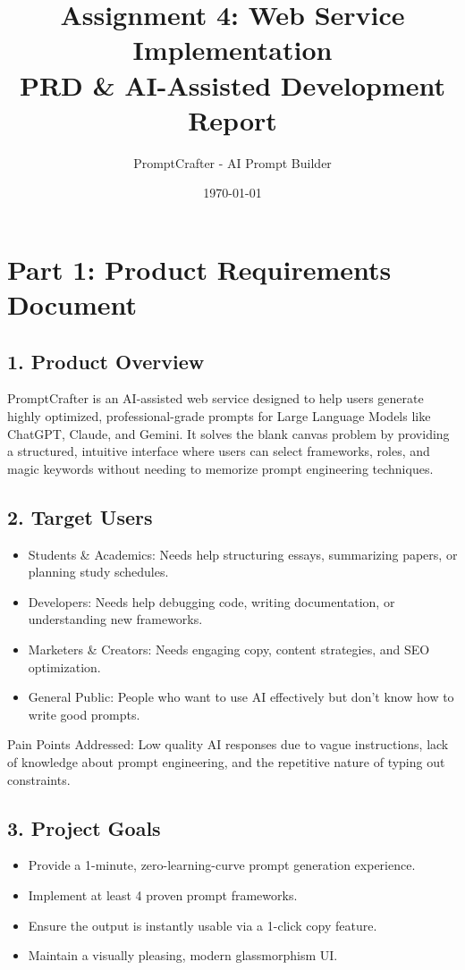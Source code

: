 \documentclass[11pt]{article}
\title{\textbf{Assignment 4: Web Service Implementation} \\ \large PRD \& AI-Assisted Development Report}
\author{PromptCrafter - AI Prompt Builder}
\date{\today}
\begin{document}
\maketitle

\section*{Part 1: Product Requirements Document}

\subsection*{1. Product Overview}
PromptCrafter is an AI-assisted web service designed to help users generate highly optimized, professional-grade prompts for Large Language Models like ChatGPT, Claude, and Gemini. It solves the blank canvas problem by providing a structured, intuitive interface where users can select frameworks, roles, and magic keywords without needing to memorize prompt engineering techniques.

\subsection*{2. Target Users}
\begin{itemize}[noitemsep]
    \item Students \& Academics: Needs help structuring essays, summarizing papers, or planning study schedules.
    \item Developers: Needs help debugging code, writing documentation, or understanding new frameworks.
    \item Marketers \& Creators: Needs engaging copy, content strategies, and SEO optimization.
    \item General Public: People who want to use AI effectively but don't know how to write good prompts.
\end{itemize}
Pain Points Addressed: Low quality AI responses due to vague instructions, lack of knowledge about prompt engineering, and the repetitive nature of typing out constraints.

\subsection*{3. Project Goals}
\begin{itemize}[noitemsep]
    \item Provide a 1-minute, zero-learning-curve prompt generation experience.
    \item Implement at least 4 proven prompt frameworks.
    \item Ensure the output is instantly usable via a 1-click copy feature.
    \item Maintain a visually pleasing, modern glassmorphism UI.
\end{itemize}
\end{document}
